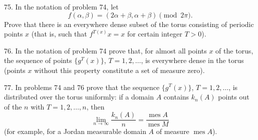 \begin{problem}{75.}
In the notation of problem 74, let
\begin{equation*}
	f(\alpha, \beta)=(2\alpha+\beta,\alpha+\beta) \pmod{2\pi}.
\end{equation*}
Prove that there is an everywhere dense subset of the torus consisting of periodic points $x$ (that is, such that
$f^{T (x)} x=x$ for certain integer $T>0$).
\end{problem}

\begin{problem}{76.}
In the notation of problem 74 prove that, for almost all points $x$ of the torus,
the sequence of points $\{g^T (x)\}$, $T=1, 2, \dotsc$, is everywhere dense in the torus
(points $x$ without this property constitute a set of measure zero).
\end{problem}

\begin{problem}{77.}
In problems 74 and 76 prove that the sequence $\{g^T (x)\}$, $T=1, 2, \dotsc$, is distributed
over the torus uniformly: if a domain $A$ contains $k_n(A)$ points out of the $n$ with $T=1, 2, \dotsc,n$, then
\begin{equation*}
	\lim_{n \to \infty} \frac{k_n(A)}{n}=\frac{\operatorname{mes} A}{\operatorname{mes} M}
\end{equation*}
(for example, for a Jordan measurable domain $A$ of measure $\operatorname{mes} A$).
\end{problem}

